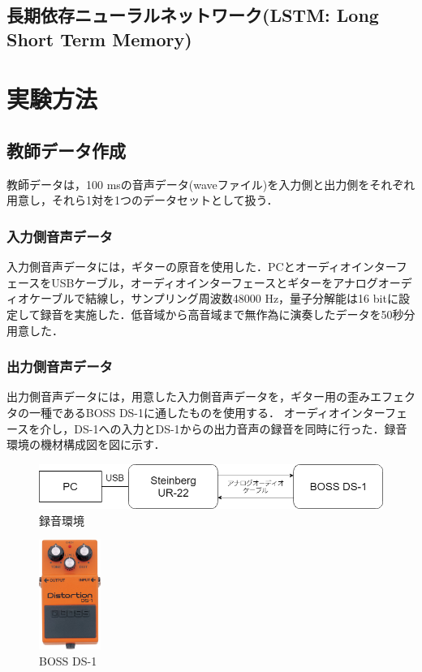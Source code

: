\documentclass{jreport}		%
\begin{document}
\section{長期依存ニューラルネットワーク(LSTM: Long Short Term Memory)}

\chapter{実験方法}
\section{教師データ作成}
教師データは，100 msの音声データ(waveファイル)を入力側と出力側をそれぞれ用意し，それら1対を1つのデータセットとして扱う．

\subsection{入力側音声データ}
入力側音声データには，ギターの原音を使用した．PCとオーディオインターフェースをUSBケーブル，オーディオインターフェースとギターをアナログオーディオケーブルで結線し，サンプリング周波数48000 Hz，量子分解能は16 bitに設定して録音を実施した．低音域から高音域まで無作為に演奏したデータを50秒分用意した．

\subsection{出力側音声データ}
出力側音声データには，用意した入力側音声データを，ギター用の歪みエフェクタの一種であるBOSS DS-1に通したものを使用する．
オーディオインターフェースを介し，DS-1への入力とDS-1からの出力音声の録音を同時に行った．録音環境の機材構成図を図に示す．

\begin{figure}[htbp]
 \begin{center}
  \includegraphics[width=120mm]{env.png}
 \end{center}
 \caption{録音環境}
 \label{fig:one}
\end{figure}

\begin{figure}[htbp]
 \begin{center}
  \includegraphics[width=20mm]{ds1.jpg}
 \end{center}
 \caption{BOSS DS-1}
 \label{fig:one}
\end{figure}
\end{document}
